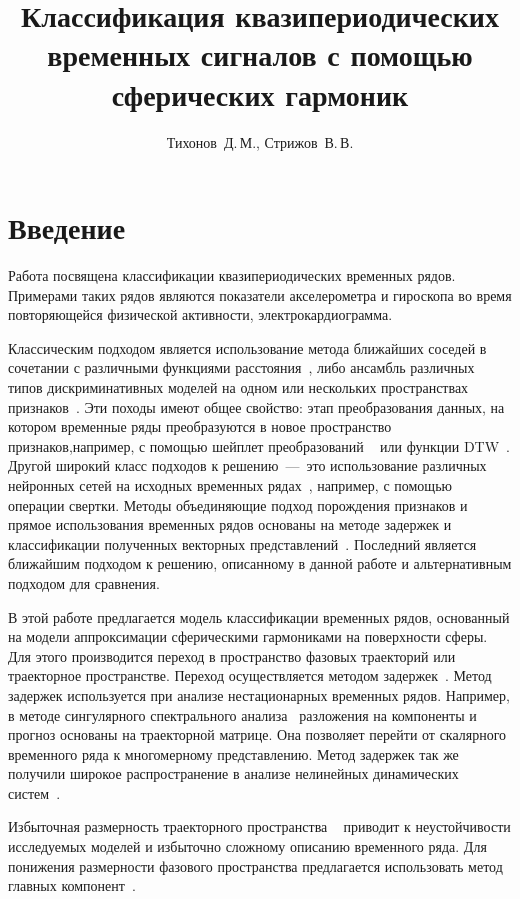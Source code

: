 \documentclass[12pt,twoside]{article}
\title
    [Классификация фазовой траектории] 
    {Классификация квазипериодических временных сигналов с помощью сферических гармоник}
\author
    {Тихонов~Д.\,М., Стрижов~В.\,В.} %
\begin{document}
\maketitle

\section{Введение}
Работа посвящена классификации квазипериодических временных рядов.
Примерами таких рядов являются показатели акселерометра и гироскопа во время повторяющейся физической активности, электрокардиограмма.

Классическим подходом является использование метода ближайших соседей в сочетании с различными функциями расстояния~\cite{Bagnall_2017}, либо ансамбль различных типов дискриминативных моделей на одном или нескольких пространствах признаков~\cite{Hills_2014, Bostrom2017, Kate_2015}.
Эти походы имеют общее свойство: этап преобразования данных, на котором временные ряды преобразуются в новое пространство признаков,например, с помощью шейплет преобразований ~\cite{ Hills_2014, Bostrom2017} или функции DTW~\cite{Kate_2015}.
Другой широкий класс подходов к решению~---~это использование различных нейронных сетей на исходных временных рядах~\cite{WANG_2019}, например, с помощью операции свертки.
Методы объединяющие подход порождения признаков и прямое использования временных рядов основаны на методе задержек и классификации полученных векторных представлений~\cite{Frank_2010}.
Последний является ближайшим подходом к решению, описанному в данной работе и альтернативным подходом для сравнения.

В этой работе предлагается модель классификации временных рядов, основанный на модели аппроксимации сферическими гармониками на поверхности сферы. 
Для этого производится переход в пространство фазовых траекторий или траекторное пространстве.
Переход осуществляется методом задержек~\cite{LAI19961}.
Метод задержек используется при анализе нестационарных временных рядов.
Например, в методе сингулярного спектрального анализа~\cite{Golyandina2002} разложения на компоненты и прогноз основаны на траекторной матрице.
Она позволяет перейти от скалярного временного ряда к многомерному представлению.
Метод задержек так же получили широкое распространение в анализе нелинейных динамических систем~\cite{Takens1981, LAI19961}.

Избыточная размерность траекторного пространства ~\cite{Golyandina2002, Motrenko2015,Usmanova2020} приводит к неустойчивости исследуемых моделей и избыточно сложному описанию временного ряда.
Для понижения размерности фазового пространства предлагается использовать  метод главных компонент~\cite{Ezukwoke2019, Scholkopf1998}.
\end{document}
